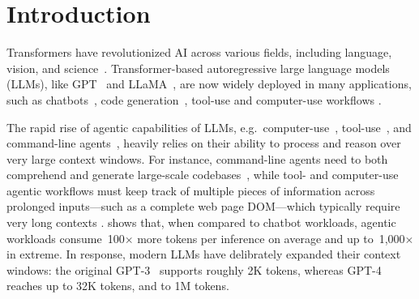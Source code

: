 \section{Introduction}

Transformers have revolutionized AI across various fields, including language, vision, and science~\cite{wei2022emergentabilitieslargelanguage,attention,kojima2023largelanguagemodelszeroshot}. Transformer-based autoregressive large language models (LLMs), like GPT~\cite{gpt4} and LLaMA~\cite{llama}, are now widely deployed in many applications, such as chatbots~\cite{chatgpt}, code generation~\cite{code_gen}, tool-use and computer-use workflows \cite{agentic_workflow}. 

The rapid rise of agentic capabilities of  LLMs, e.g.~computer-use~\cite{OmniParser}, tool-use~\cite{browser_use2024, WebVoyager}, and command-line agents~\cite{command_agent}, heavily relies on their ability to process and reason over very large context windows. For instance, command-line agents need to both comprehend and generate large-scale codebases~\cite{code_gen_long_context, multi-swe, LongCodeBench}, while tool- and computer-use agentic workflows must keep track of multiple pieces of information across prolonged inputs---such as a complete web page DOM---which typically require very long contexts \cite{webdom_long_context,workarena,BrowserGym}.
 shows that, when compared to chatbot workloads, agentic workloads consume~100$\times$ more tokens per inference on average and up to~1,000$\times$ in extreme. In response, modern LLMs have delibrately expanded their context windows: the original GPT-3~\cite{gpt3} supports roughly 2K tokens, whereas GPT-4\cite{gpt4} reaches up to 32K tokens, and \llamaIVMVK\cite{llama4_maverick} to 1M tokens.

